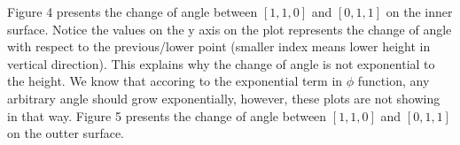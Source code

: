 \documentclass[a4paper,12pt]{article} %
\begin{document}
Figure 4 presents the change of angle between $[1,1,0]$ and $[0,1,1]$ on the inner surface. Notice the values on the y axis on the plot 
represents the change of angle with respect to the previous\slash lower point (smaller index means lower height in vertical direction). This explains
why the change of angle is not exponential to the height. We know that accoring to the exponential term in $\phi$ function, any arbitrary angle should grow 
exponentially, however, these plots are not showing in that way. 
Figure 5 presents the change of angle between $[1,1,0]$ and $[0,1,1]$ on the outter surface.
     
\end{document}
